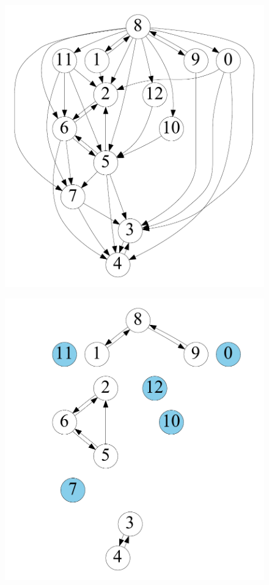 \begin{figure}[t]
    \centering
    \begin{minipage}[b]{0.19\linewidth}
        \captionsetup{type=figure}
        \centering
            {\includegraphics[width=\textwidth]{./alg_fig/scc-g0}}
    \end{minipage}
   	\begin{minipage}[b]{0.19\linewidth}
        \centering
                    {\includegraphics[width=\textwidth]{./alg_fig/scc-g1}}

\end{minipage}
\end{figure}
